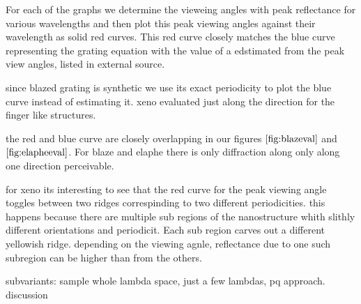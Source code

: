 For each of the graphs we determine the vieweing angles with peak reflectance for various wavelengths and then plot this peak viewing angles against their wavelength as solid red curves. This red curve closely matches the blue curve representing the grating equation with the value of a edstimated from the peak view angles, listed in external source.


since blazed grating is synthetic we use its exact periodicity to plot the blue curve instead of estimating it. xeno evaluated just along the direction for the finger like structures.

the red and blue curve are closely overlapping in our figures $\ref{fig:blazeval}$ and $\ref{fig:elapheeval}$. For blaze and elaphe there is only diffraction along only along one direction perceivable.

for xeno its interesting to see that the red curve for the peak viewing angle toggles between two ridges correspinding to two different periodicities. this happens because there are multiple sub regions of the nanostructure whith slithly different orientations and periodicit. Each sub region carves out a different yellowish ridge. depending on the viewing agnle, reflectance due to one such subregion can be higher than from the others.




subvariants: sample whole lambda space, just a few lambdas, pq approach.
discussion
